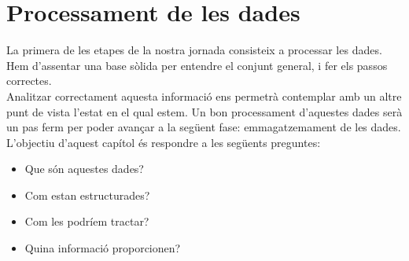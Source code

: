 \chapter{Processament de les dades}\label{ch:log-processing}

La primera de les etapes de la nostra jornada consisteix a processar les dades.
Hem d'assentar una base sòlida per entendre el conjunt general, i fer els passos correctes. \\

\noindent
Analitzar correctament aquesta informació ens permetrà contemplar amb un altre punt de vista l'estat en el qual estem.
Un bon processament d'aquestes dades serà un pas ferm per poder avançar a la següent fase: emmagatzemament de les dades. \\

\noindent
L'objectiu d'aquest capítol és respondre a les següents preguntes:

\begin{itemize}
    \item Que són aquestes dades?
    \item Com estan estructurades?
    \item Com les podríem tractar?
    \item Quina informació proporcionen?
\end{itemize}


\clearpage

